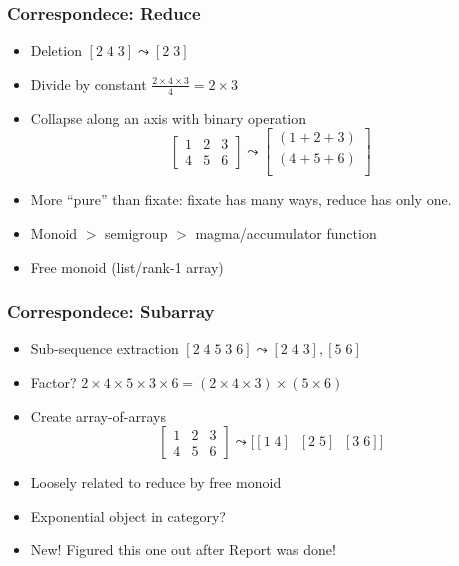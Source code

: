 \documentclass[xetex,mathserif,serif]{beamer}
\begin{document}
\begin{frame}
  \frametitle{Correspondece: Reduce}
  \pause
  \begin{itemize}[<+->]
    \item Deletion \([2\;4\;3] \leadsto [2\;3]\)
    \item Divide by constant \(\frac{2\times4\times3}4 = 2\times3\)
    \item Collapse along an axis with binary operation
      \[
        \begin{bmatrix}
          1 & 2 & 3 \\
          4 & 5 & 6
        \end{bmatrix} \leadsto
        \begin{bmatrix}
          (1 + 2 + 3) \\
          (4 + 5 + 6) \\
        \end{bmatrix}
      \]
    \item More ``pure'' than fixate: fixate has many ways,
      reduce has only one.
    \item Monoid $>$ semigroup $>$ magma/accumulator function
    \item Free monoid (list/rank-1 array)
  \end{itemize}
\end{frame}

\begin{frame}
  \frametitle{Correspondece: Subarray}
  \pause
  \begin{itemize}[<+->]
    \item Sub-sequence extraction \([2\;4\;5\;3\;6] \leadsto [2\;4\;3], [5\;6]\)
    \item Factor? \(2\times4\times5\times3\times6 = (2\times4\times3)\times(5\times6)\)
    \item Create array-of-arrays
      \[
        \begin{bmatrix}
          1 & 2 & 3 \\
          4 & 5 & 6
        \end{bmatrix} \leadsto \big[[1\;4]\;\;[2\;5]\;\;[3\;6]\big]
      \]
    \item Loosely related to reduce by free monoid
    \item Exponential object in category?
    \item New! Figured this one out after Report was done!
  \end{itemize}
\end{frame}
\end{document}
